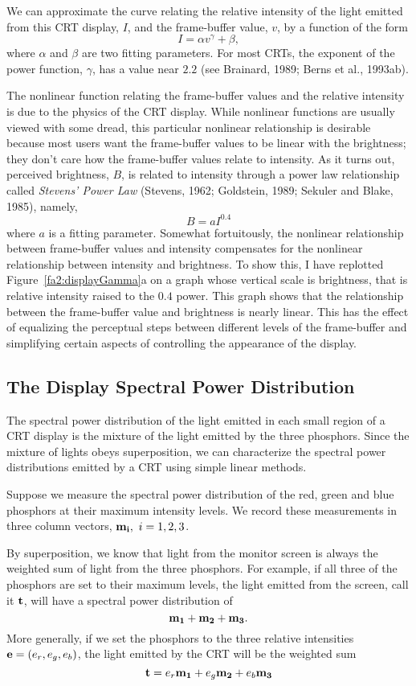 We can approximate the curve relating the relative intensity of the
light emitted from this CRT display, $I$, and the frame-buffer value,
$v$, by a function of the form
\[
I = \alpha v^\gamma + \beta ,
\]
where $\alpha$ and $\beta$ are two fitting parameters.  For most CRTs,
the exponent of the power function, $\gamma$, has a value near $2.2$
(see Brainard, 1989; Berns et al., 1993ab).

The nonlinear function relating the frame-buffer values and the relative
intensity is due to the physics of the CRT display.  While nonlinear
functions are usually viewed with some dread, this particular
nonlinear relationship is desirable because most users want the
frame-buffer values to be linear with the brightness; they don't care
how the frame-buffer values relate to intensity.  As it turns out,
perceived brightness, $B$, is related to intensity through a power law
relationship called {\em Stevens' Power Law} (Stevens, 1962;
Goldstein, 1989; Sekuler and Blake, 1985), namely,
\[
B = a I ^{0.4}
\]
where $a$ is a fitting parameter. Somewhat fortuitously, the nonlinear
relationship between frame-buffer values and intensity compensates for
the nonlinear relationship between intensity and brightness.  To show
this, I have replotted Figure~\ref{fa2:displayGamma}a on a graph
whose vertical scale is brightness, that is relative intensity
raised to the $0.4$ power.  This graph shows that the relationship
between the frame-buffer value and brightness is nearly linear.  This
has the effect of equalizing the perceptual steps between different
levels of the frame-buffer and simplifying certain aspects of
controlling the appearance of the display.

\subsection*{The Display Spectral Power Distribution}
The spectral power distribution of the light emitted in each small
region of a CRT display is the mixture of the light emitted by the
three phosphors.  Since the mixture of lights obeys superposition, we
can characterize the spectral power distributions emitted by a CRT
using simple linear methods.

Suppose we measure the spectral power distribution of the red, green
and blue phosphors at their maximum intensity levels.  We record these
measurements in three column vectors, $\mbox{$\bf m_{i}$}, ~ i = 1,2,3$.

By superposition, we know that light from the monitor screen is always
the weighted sum of light from the three phosphors.  For example, if
all three of the phosphors are set to their maximum levels, the light
emitted from the screen, call it $\mbox{${\bf t}$}$, will have a spectral power
distribution of
\[
\mbox{$\bf m_{1}$} + \mbox{$\bf m_{2}$} + \mbox{$\bf m_{3}$} .
\]
More generally, if we set the phosphors to the three relative
intensities $\mbox{$\bf e$} = ( e_r , e_g , e_b )$, the light emitted by the
CRT will be the weighted sum
\[
\label{ea2:mo}
\mbox{${\bf t}$} = e_r \mbox{$\bf m_{1}$} + e_g \mbox{$\bf m_{2}$} + e_b \mbox{$\bf m_{3}$}
\]

